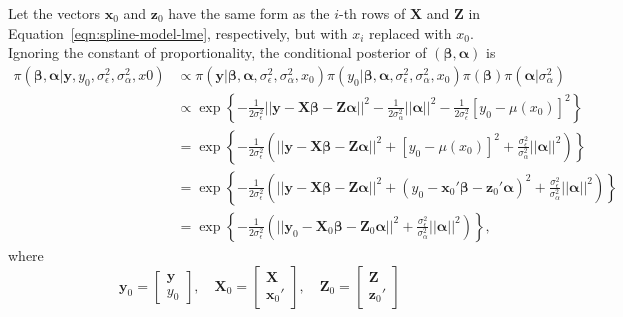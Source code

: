 \documentclass[cmfont,usenames,dvipsnames,leqno]{afit-etd}\usepackage[]{graphicx}\usepackage[]{color}
\begin{document}
Let the vectors $\boldsymbol{x}_0$ and $\boldsymbol{z}_0$ have the same form as the $i$-th rows of $\boldsymbol{X}$ and $\boldsymbol{Z}$ in Equation~\eqref{eqn:spline-model-lme}, respectively, but with $x_i$ replaced with $x_0$. Ignoring the constant of proportionality, the conditional posterior of $\left(\boldsymbol{\beta}, \boldsymbol{\alpha}\right)$ is
\begin{align*}
  \pi\left(\boldsymbol{\beta}, \boldsymbol{\alpha}|\boldsymbol{y}, y_0, \sigma_\epsilon^2, \sigma_\alpha^2, x0\right) &\propto \pi\left(\boldsymbol{y}|\boldsymbol{\beta}, \boldsymbol{\alpha}, \sigma_\epsilon^2, \sigma_\alpha^2, x_0\right) \pi\left(y_0|\boldsymbol{\beta}, \boldsymbol{\alpha}, \sigma_\epsilon^2, \sigma_\alpha^2, x_0\right) \pi\left(\boldsymbol{\beta}\right) \pi\left(\boldsymbol{\alpha}|\sigma_\alpha^2\right) \\
  &\propto \exp\left\{-\frac{1}{2\sigma_\epsilon^2}||\boldsymbol{y} - \boldsymbol{X}\boldsymbol{\beta} - \boldsymbol{Z}\boldsymbol{\alpha}||^2 - \frac{1}{2\sigma_\alpha^2}||\boldsymbol{\alpha}||^2 - \frac{1}{2\sigma_\epsilon^2}\left[y_0-\mu(x_0)\right]^2\right\} \\
  &= \exp\left\{-\frac{1}{2\sigma_\epsilon^2}\left(||\boldsymbol{y} - \boldsymbol{X}\boldsymbol{\beta} - \boldsymbol{Z}\boldsymbol{\alpha}||^2 + \left[y_0-\mu(x_0)\right]^2 + \frac{\sigma_\epsilon^2}{\sigma_\alpha^2}||\boldsymbol{\alpha}||^2\right)\right\} \\
  &= \exp\left\{-\frac{1}{2\sigma_\epsilon^2}\left(||\boldsymbol{y} - \boldsymbol{X}\boldsymbol{\beta} - \boldsymbol{Z}\boldsymbol{\alpha}||^2 + \left(y_0-\boldsymbol{x}_0'\boldsymbol{\beta} - \boldsymbol{z}_0'\boldsymbol{\alpha}\right)^2 + \frac{\sigma_\epsilon^2}{\sigma_\alpha^2}||\boldsymbol{\alpha}||^2\right)\right\} \\
  &= \exp\left\{-\frac{1}{2\sigma_\epsilon^2}\left(||\boldsymbol{y}_0 - \boldsymbol{X}_0\boldsymbol{\beta} - \boldsymbol{Z}_0\boldsymbol{\alpha}||^2 + \frac{\sigma_\epsilon^2}{\sigma_\alpha^2}||\boldsymbol{\alpha}||^2\right)\right\},
\end{align*}
where 
\begin{equation*}
  \boldsymbol{y}_0 = \begin{bmatrix} \boldsymbol{y} \\ y_0 \end{bmatrix}, \quad
  \boldsymbol{X}_0 = \begin{bmatrix} \boldsymbol{X} \\ \boldsymbol{x}_0' \end{bmatrix}, \quad
  \boldsymbol{Z}_0 = \begin{bmatrix} \boldsymbol{Z} \\ \boldsymbol{z}_0' \end{bmatrix}
\end{equation*}
\end{document}
